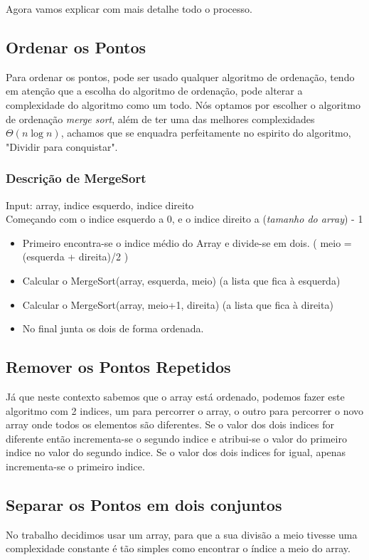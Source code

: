 \documentclass[11pt]{article}
\begin{document}
Agora vamos explicar com mais detalhe todo o processo.
\subsection{ Ordenar os Pontos }
Para ordenar os pontos, pode ser usado qualquer algoritmo de ordenação,
tendo em atenção que a escolha do algoritmo de ordenação, pode alterar a
complexidade do algoritmo como um todo.
Nós optamos por escolher o algoritmo de ordenação \textit{merge sort},
além de ter uma das melhores complexidades $\Theta(n\log{}n)$, achamos 
que se enquadra perfeitamente no espirito do algoritmo, "Dividir para conquistar".

\subsubsection{Descrição de MergeSort}
Input: array, indice esquerdo, indice direito\\

Começando com o indice esquerdo a 0, e o indice direito a (\textit{tamanho do array}) - 1
\begin{itemize}
    \item Primeiro encontra-se o indice médio do Array e divide-se em dois. 
        ( meio = (esquerda + direita)/2 )
    \item Calcular o MergeSort(array, esquerda, meio) (a lista que fica à esquerda)
    \item Calcular o MergeSort(array, meio+1, direita) (a lista que fica à direita)
    \item No final junta os dois de forma ordenada.
\end{itemize}

\subsection{ Remover os Pontos Repetidos }
Já que neste contexto sabemos que o array está ordenado,
podemos fazer este algoritmo com 2 indices, um para percorrer
o array, o outro para percorrer o novo array onde todos os 
elementos são diferentes. Se o valor dos dois indices for
diferente então incrementa-se o segundo indice e atribui-se
o valor do primeiro indice no valor do segundo indice. Se o 
valor dos dois indices for igual, apenas incrementa-se o
primeiro indice.

\subsection{ Separar os Pontos em dois conjuntos }
No trabalho decidimos usar um array, para que a sua divisão a meio 
tivesse uma complexidade constante é tão simples como encontrar o 
índice a meio do array.
\end{document}
